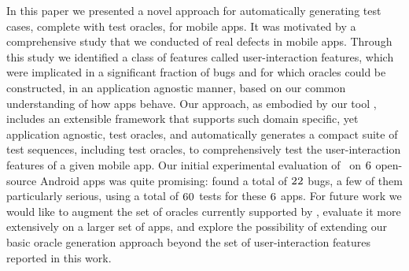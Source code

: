 \label{conclusion}

In this paper we presented a novel approach for automatically generating test cases, complete with test oracles, for mobile apps. It was motivated by a comprehensive study that we conducted of real defects in mobile apps. Through this study we identified a class of features called user-interaction features, which were implicated in a significant fraction of bugs and for which oracles could be constructed, in an application agnostic manner, based on our common understanding of how apps behave.  Our approach, as embodied by our tool \tool, includes an extensible framework that supports such domain specific, yet application agnostic, test oracles, and automatically generates a compact suite of test sequences,
including test oracles, to comprehensively test the user-interaction features of a given mobile app. Our initial experimental evaluation of \tool\ on $\textsc{6}$ open-source Android apps was quite promising: \tool{} found a total of $\textsc{22}$ bugs, a few of them particularly serious, using a 
total of $\textsc{60}$ tests for these $\textsc{6}$ apps. 
For future work we would like to augment the set of oracles currently supported by \tool, evaluate it more extensively on a larger set of apps, and explore the possibility of extending our basic oracle generation approach beyond the set of user-interaction features reported in this work.


